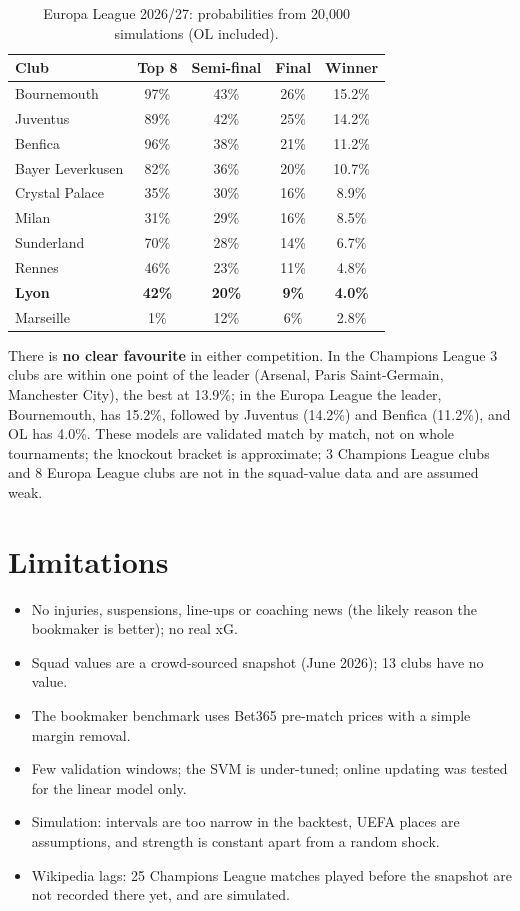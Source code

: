 \documentclass[11pt,a4paper]{article}
\theoremstyle{definition}
\theoremstyle{remark}
\begin{document}
\begin{table}[H]
\caption{Europa League 2026/27: probabilities from 20{,}000 simulations (OL included).}
\begin{center}
\small
\begin{tabular}{lcccc}
\toprule
\textbf{Club} & \textbf{Top 8} & \textbf{Semi-final} & \textbf{Final} & \textbf{Winner} \\
\midrule
Bournemouth & 97\% & 43\% & 26\% & 15.2\% \\
Juventus & 89\% & 42\% & 25\% & 14.2\% \\
Benfica & 96\% & 38\% & 21\% & 11.2\% \\
Bayer Leverkusen & 82\% & 36\% & 20\% & 10.7\% \\
Crystal Palace & 35\% & 30\% & 16\% & 8.9\% \\
Milan & 31\% & 29\% & 16\% & 8.5\% \\
Sunderland & 70\% & 28\% & 14\% & 6.7\% \\
Rennes & 46\% & 23\% & 11\% & 4.8\% \\
\textbf{Lyon} & \textbf{42\%} & \textbf{20\%} & \textbf{9\%} & \textbf{4.0\%} \\
Marseille & 1\% & 12\% & 6\% & 2.8\% \\
\bottomrule
\end{tabular}
\end{center}
\end{table}

There is \textbf{no clear favourite} in either competition. In the Champions League 3 clubs are within one point of the leader (Arsenal, Paris Saint-Germain, Manchester City), the best at 13.9\%;
in the Europa League the leader, Bournemouth, has 15.2\%, followed by Juventus (14.2\%) and Benfica (11.2\%), and OL has 4.0\%.
These models are validated match by match, not on whole tournaments; the knockout bracket is approximate; 3 Champions League clubs and 8 Europa League clubs are not in the squad-value data and are assumed weak.

\section{Limitations}

\begin{itemize}
\item No injuries, suspensions, line-ups or coaching news (the likely reason the bookmaker is better); no real xG.
\item Squad values are a crowd-sourced snapshot (June 2026); 13 clubs have no value.
\item The bookmaker benchmark uses Bet365 pre-match prices with a simple margin removal.
\item Few validation windows; the SVM is under-tuned; online updating was tested for the linear model only.
\item Simulation: intervals are too narrow in the backtest, UEFA places are assumptions, and strength is constant apart from a random shock.
\item Wikipedia lags: 25 Champions League matches played before the snapshot are not recorded there yet, and are simulated.
\end{itemize}
\end{document}
